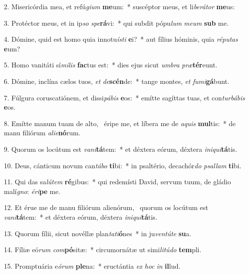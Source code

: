 2. Misericórdia mea, et refú\textit{gi}\textit{um} \textbf{me}um:~*  suscéptor meus, et li\textit{be}\textit{rá}\textit{tor} \textbf{me}us:\

3. Protéctor meus, et in ip\textit{so} \textit{spe}\textbf{rá}vi:~*  qui subdit pópu\textit{lum} \textit{me}\textit{um} \textbf{sub} me.\

4. Dómine, quid est homo quia innotu\textit{ís}\textit{ti} \textbf{e}i?~*  aut fílius hóminis, quia \textit{ré}\textit{pu}\textit{tas} \textbf{e}um?\

5. Homo vanitáti sí\textit{mi}\textit{lis} \textbf{fac}tus est:~*  dies ejus sicut \textit{um}\textit{bra} \textit{præ}\textbf{tér}eunt.\

6. Dómine, inclína cælos tuos, \textit{et} \textit{de}\textbf{scén}de:~*  tange montes, \textit{et} \textit{fu}\textit{mi}\textbf{gá}bunt.\

7. Fúlgura coruscatiónem, et dissi\textit{pá}\textit{bis} \textbf{e}os:~*  emítte sagíttas tuas, et con\textit{tur}\textit{bá}\textit{bis} \textbf{e}os.\

8. Emítte manum tuam de alto, \dag\  éripe me, et líbera me de \textit{a}\textit{quis} \textbf{mul}tis:~*  de manu filiórum \textit{a}\textit{li}\textit{e}\textbf{nó}rum.\

9. Quorum os locútum est \textit{va}\textit{ni}\textbf{tá}tem:~*  et déxtera eórum, déxtera \textit{in}\textit{i}\textit{qui}\textbf{tá}tis.\

10. Deus, cánticum novum can\textit{tá}\textit{bo} \textbf{ti}bi:~*  in psaltério, decachór\textit{do} \textit{psal}\textit{lam} \textbf{ti}bi.\

11. Qui das sa\textit{lú}\textit{tem} \textbf{ré}gibus:~*  qui redemísti David, servum tuum, de gládio malí\textit{gno}: \textit{é}\textit{ri}\textbf{pe} me.\

12. Et érue me de manu filiórum alienórum, \dag\  quorum os locútum est \textit{va}\textit{ni}\textbf{tá}tem:~*  et déxtera eórum, déxtera \textit{in}\textit{i}\textit{qui}\textbf{tá}tis.\

13. Quorum fílii, sicut novéllæ plan\textit{ta}\textit{ti}\textbf{ó}nes~*  in ju\textit{ven}\textit{tú}\textit{te} \textbf{su}a.\

14. Fíliæ eó\textit{rum} \textit{com}\textbf{pó}sitæ:~*  circumornátæ ut simi\textit{li}\textit{tú}\textit{do} \textbf{tem}pli.\

15. Promptuária e\textit{ó}\textit{rum} \textbf{ple}na:~*  eructántia \textit{ex} \textit{hoc} \textit{in} \textbf{il}lud.\

